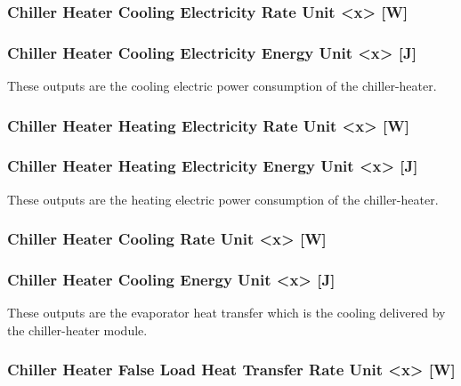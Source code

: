 \subsubsection{Chiller Heater Cooling Electricity Rate Unit \textless{}x\textgreater{} {[}W{]}}\label{chiller-heater-cooling-electric-power-unit-x-w}

\subsubsection{Chiller Heater Cooling Electricity Energy Unit \textless{}x\textgreater{} {[}J{]}}\label{chiller-heater-cooling-electric-energy-unit-x-j}

These outputs are the cooling electric power consumption of the chiller-heater.

\subsubsection{Chiller Heater Heating Electricity Rate Unit \textless{}x\textgreater{} {[}W{]}}\label{chiller-heater-heating-electric-power-unit-x-w}

\subsubsection{Chiller Heater Heating Electricity Energy Unit \textless{}x\textgreater{} {[}J{]}}\label{chiller-heater-heating-electric-energy-unit-x-j}

These outputs are the heating electric power consumption of the chiller-heater.

\subsubsection{Chiller Heater Cooling Rate Unit \textless{}x\textgreater{} {[}W{]}}\label{chiller-heater-cooling-rate-unit-x-w}

\subsubsection{Chiller Heater Cooling Energy Unit \textless{}x\textgreater{} {[}J{]}}\label{chiller-heater-cooling-energy-unit-x-j}

These outputs are the evaporator heat transfer which is the cooling delivered by the chiller-heater module.

\subsubsection{Chiller Heater False Load Heat Transfer Rate Unit \textless{}x\textgreater{} {[}W{]}}\label{chiller-heater-false-load-heat-transfer-rate-unit-x-w}

